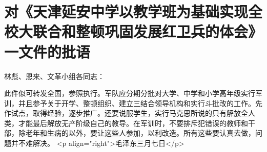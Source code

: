 \section[对《天津延安中学以教学班为基础实现全校大联合和整顿巩固发展红卫兵的体会》一文件的批语（一九六七年三月七日）]{对《天津延安中学以教学班为基础实现全校大联合和整顿巩固发展红卫兵的体会》一文件的批语}


林彪、恩来、文革小组各同志：

此件似可转发全国，参照执行。军队应分期分批对大学、中学和小学高年级实行军训，并且参予关于开学、整顿组织、建立三结合领导机构和实行斗批改的工作。先作试点，取得经验，逐步推广。还要说服学生，实行马克思所说的只有解放全人类，才能最后解放无产阶级自己的教导。在军训时，不要排斥犯错误的教师和干部，除老年和生病的以外，要让这些人参加，以利改造。所有这些要认真去做，问题并不难解决。
<p align="right">毛泽东三月七日</p>


